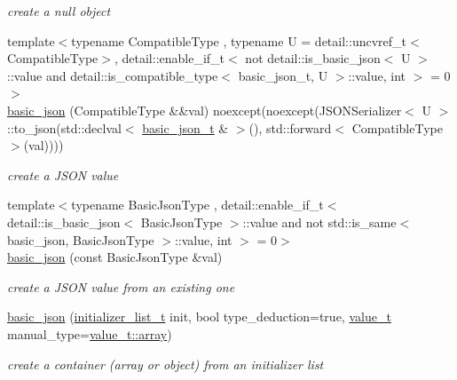 \begin{DoxyCompactItemize}
\begin{DoxyCompactList}\small\item\em create a null object \end{DoxyCompactList}\item 
{\footnotesize template$<$typename Compatible\+Type , typename U  = detail\+::uncvref\+\_\+t$<$\+Compatible\+Type$>$, detail\+::enable\+\_\+if\+\_\+t$<$ not detail\+::is\+\_\+basic\+\_\+json$<$ U $>$\+::value and detail\+::is\+\_\+compatible\+\_\+type$<$ basic\+\_\+json\+\_\+t, U $>$\+::value, int $>$  = 0$>$ }\\\hyperlink{classnlohmann_1_1basic__json_a7639e0834df2bc719a04ffea89b31abc}{basic\+\_\+json} (Compatible\+Type \&\&val) noexcept(noexcept(J\+S\+O\+N\+Serializer$<$ U $>$\+::to\+\_\+json(std\+::declval$<$ \hyperlink{classnlohmann_1_1basic__json_afff7860310ae69f29f8158a77ec0ef13}{basic\+\_\+json\+\_\+t} \& $>$(), std\+::forward$<$ Compatible\+Type $>$(val))))
\begin{DoxyCompactList}\small\item\em create a J\+S\+ON value \end{DoxyCompactList}\item 
{\footnotesize template$<$typename Basic\+Json\+Type , detail\+::enable\+\_\+if\+\_\+t$<$ detail\+::is\+\_\+basic\+\_\+json$<$ Basic\+Json\+Type $>$\+::value and not std\+::is\+\_\+same$<$ basic\+\_\+json, Basic\+Json\+Type $>$\+::value, int $>$  = 0$>$ }\\\hyperlink{classnlohmann_1_1basic__json_aa16dc469c842fa8a0aaf6f5a95c46bb3}{basic\+\_\+json} (const Basic\+Json\+Type \&val)
\begin{DoxyCompactList}\small\item\em create a J\+S\+ON value from an existing one \end{DoxyCompactList}\item 
\hyperlink{classnlohmann_1_1basic__json_ab5dfd9a2b2663b219641cb7fe59b6da2}{basic\+\_\+json} (\hyperlink{classnlohmann_1_1basic__json_a670f6a0eb3d1e0ffd00c27d35472ccc9}{initializer\+\_\+list\+\_\+t} init, bool type\+\_\+deduction=true, \hyperlink{namespacenlohmann_1_1detail_a1ed8fc6239da25abcaf681d30ace4985}{value\+\_\+t} manual\+\_\+type=\hyperlink{namespacenlohmann_1_1detail_a1ed8fc6239da25abcaf681d30ace4985af1f713c9e000f5d3f280adbd124df4f5}{value\+\_\+t\+::array})
\begin{DoxyCompactList}\small\item\em create a container (array or object) from an initializer list \end{DoxyCompactList}\item 

\end{DoxyCompactItemize}
